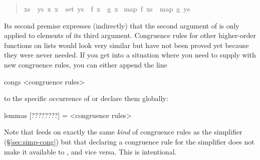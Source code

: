 \begin{isabellebody}
\begin{isamarkuptext}
\begin{quote}
\begin{isabelle}%
{\isasymlbrakk}\mbox{xs}\ {\isacharequal}\ \mbox{ys}{\isacharsemicolon}\ {\isasymAnd}\mbox{x}{\isachardot}\ \mbox{x}\ {\isasymin}\ set\ \mbox{ys}\ {\isasymLongrightarrow}\ \mbox{f}\ \mbox{x}\ {\isacharequal}\ \mbox{g}\ \mbox{x}{\isasymrbrakk}\isanewline
{\isasymLongrightarrow}\ map\ \mbox{f}\ \mbox{xs}\ {\isacharequal}\ map\ \mbox{g}\ \mbox{ys}
\end{isabelle}%

\end{quote}
Its second premise expresses (indirectly) that the second argument of
 is only applied to elements of its third argument. Congruence
rules for other higher-order functions on lists would look very similar but
have not been proved yet because they were never needed. If you get into a
situation where you need to supply  with new congruence
rules, you can either append the line
\begin{ttbox}
congs <congruence rules>
\end{ttbox}
to the specific occurrence of  or declare them globally:
\begin{ttbox}
lemmas [????????] = <congruence rules>
\end{ttbox}

Note that  feeds on exactly the same \emph{kind} of
congruence rules as the simplifier (\S\ref{sec:simp-cong}) but that
declaring a congruence rule for the simplifier does not make it
available to , and vice versa. This is intentional.%
\end{isamarkuptext}%
\end{isabellebody}%
